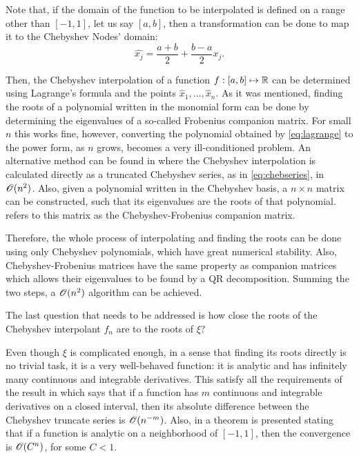 Note that, if the domain of the function to be interpolated is defined on a range other than $[-1, 1]$, let us say $[a, b]$, then a transformation can be done to map it to the Chebyshev Nodes' domain:
\begin{equation}
\hat{x_j} = \frac{a+b}{2} + \frac{b-a}{2}x_j.
\end{equation}

Then, the Chebyshev interpolation of a function $f: [a, b] \mapsto \mathbb{R}$ can be determined using Lagrange's formula and the points $\hat{x}_1, \dots, \hat{x}_n$. 
As it was mentioned, finding the roots of a polynomial written in the monomial form can be done by determining the eigenvalues of a so-called Frobenius companion matrix. For small $n$ this works fine, however, converting the polynomial obtained by \autoref{eq:lagrange} to the power form, as $n$ grows, becomes a very ill-conditioned problem. 
An alternative method can be found in  where the Chebyshev interpolation is calculated directly as a truncated Chebyshev series, as in \autoref{eq:chebseries}, in $\mathscr{O}(n^2)$. Also, given a polynomial written in the Chebyshev basis, a $n\times n$ matrix can be constructed, such that its eigenvalues are the roots of that polynomial.  refers to this matrix as the Chebyshev-Frobenius companion matrix.

Therefore, the whole process of interpolating and finding the roots can be done using only Chebyshev polynomials, which have great numerical stability. Also, Chebyshev-Frobenius matrices have the same property as companion matrices which allows their eigenvalues to be found by a QR decomposition. Summing the two steps, a $\mathscr{O}(n^2)$ algorithm can be achieved.

The last question that needs to be addressed is how close the roots of the Chebyshev interpolant $f_n$ are to the roots of $\xi$?

Even though $\xi$ is complicated enough, in a sense that finding its roots directly is no trivial task, it is a very well-behaved function: it is analytic and  has infinitely many continuous and integrable derivatives. This satisfy all the requirements of the result in  which says that if a function has $m$ continuous and integrable derivatives on a closed interval, then its absolute difference between the Chebyshev truncate series is $\mathscr{O}(n^{-m})$. Also, in  a theorem is presented stating that if a function is analytic on a neighborhood of $[-1, 1]$, then the convergence is $\mathscr{O}(C^n)$, for some $C<1$.

